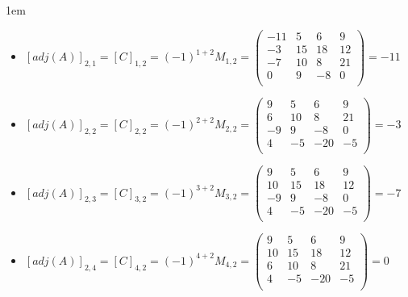 \documentclass[12pt, fleqn]{article}                             %
\newenvironment{SmallIndentation}[1][0.75em]                    %
        {\begin{adjustwidth}{#1}{}\begin{footnotesize}}             %
        {\end{footnotesize}\end{adjustwidth}}                       %
\theoremstyle{break}                                            %
\newcommand{\pVector}[1]                                        %
        { \ensuremath{\begin{pmatrix}#1\end{pmatrix}} }             %
\begin{document}
\begin{itemize}
\begin{SmallIndentation}[1em]
\begin{itemize}
                    \item
                        $[adj(A)]_{2, 1} 
                            = [C]_{1, 2} 
                            = (-1)^{1+2} M_{1, 2}
                            = \pVector{
                                    -11 & 5  & 6   & 9    \\
                                    -3  & 15 & 18  & 12   \\
                                    -7  & 10 & 8   & 21   \\
                                    0   & 9  & -8  & 0    \\
                                }
                            = -11$

                    \item
                        $[adj(A)]_{2, 2} 
                            = [C]_{2, 2} 
                            = (-1)^{2+2} M_{2, 2}
                            = \pVector{
                                    9  & 5  & 6   & 9    \\
                                    6  & 10 & 8   & 21   \\
                                    -9 & 9  & -8  & 0    \\
                                    4  & -5 & -20 & -5   \\
                                }
                            = -3$

                    \item
                        $[adj(A)]_{2, 3} 
                            = [C]_{3, 2} 
                            = (-1)^{3+2} M_{3, 2}
                            = \pVector{
                                    9  & 5  & 6   & 9    \\
                                    10 & 15 & 18  & 12   \\
                                    -9 & 9  & -8  & 0    \\
                                    4  & -5 & -20 & -5   \\
                                }
                            = -7$

                    \item
                        $[adj(A)]_{2, 4} 
                            = [C]_{4, 2} 
                            = (-1)^{4+2} M_{4, 2}
                            = \pVector{
                                    9  & 5  & 6   & 9    \\
                                    10 & 15 & 18  & 12   \\
                                    6  & 10 & 8   & 21   \\
                                    4  & -5 & -20 & -5   \\
                                }
                            = 0$


\end{itemize}
\end{SmallIndentation}
\end{itemize}
\end{document}
